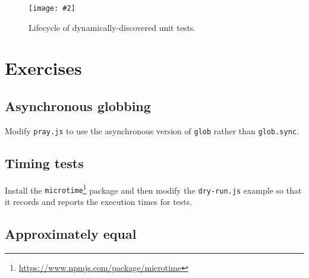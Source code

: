 \documentclass[krantzl]{krantz}
\newcommand{\figpdf}[4]{\begin{figure}%
\centering%
\texttt{[image: \#2]}%
\caption{#3}%
\label{#1}%
\end{figure}}
\newcommand{\hreffoot}[2]{{#1}\footnote{\href{#2}{#2}}}
\begin{document}
\figpdf{unit-test-lifecycle}{./unit-test/lifecycle.pdf}{Lifecycle of dynamically-discovered unit tests.}{0.6}


\section{Exercises}\label{unit-test-exercises}

\subsection*{Asynchronous globbing}


Modify \texttt{pray.js} to use the asynchronous version of \texttt{glob} rather than \texttt{glob.sync}.

\subsection*{Timing tests}


Install the \hreffoot{\texttt{microtime}}{https://www.npmjs.com/package/microtime} package and then modify the \texttt{dry-run.js} example
so that it records and reports the execution times for tests.

\subsection*{Approximately equal}
\end{document}
